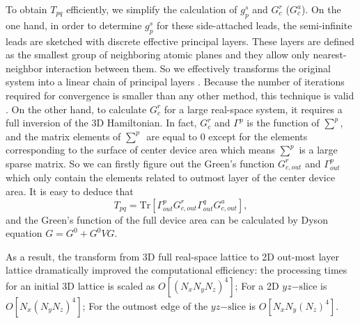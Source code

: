 \documentclass[twocolumn,superscriptaddress]{revtex4}%
\begin{document}
To obtain $T_{pq}$ efficiently, we simplify the calculation of $g_{p}^{s}$ and
$G_{c}^{r}$ ($G_{c}^{a}$). On the one hand, in order to determine $g_{p}^{s}$ for these
side-attached leads, the semi-infinite leads are sketched with discrete
effective principal layers. These layers are defined as the smallest group of
neighboring atomic planes and they allow only nearest-neighbor interaction
between them. So we effectively transforms the original system into a linear
chain of principal layers \cite{Sancho1984,TrM2013,Mtd2005,Mtd2006}. Because
the number of iterations required for convergence is smaller than any other
method, this technique is valid \cite{Iterations2008,Iterations2010}. On the
other hand, to calculate $G_{c}^{r}$ for a large real-space system, it
requires a full inversion of the 3D Hamiltonian. In fact, $G_{c}^{r}$ and
$\Gamma^{p}$ is the function of $\sum^{p}$, and the matrix elements of
$\sum^{p}$\ are equal to $0$ except for the elements corresponding to the
surface of center device area which means $\sum^{p}$ is a large sparse matrix.
So we can firstly figure out the Green's function $G_{c,out}^{r}$ and
$\Gamma_{out}^{p}$ which only contain the elements related to outmost layer of
the center device area. It is easy to deduce that%
\begin{equation}
T_{pq}=\mathrm{Tr}[\Gamma_{out}^{p}G_{c,out}^{r}\Gamma_{out}^{q}G_{c,out}%
^{a}],
\end{equation}
and the Green's function of the full device area can be calculated by Dyson
equation $G=G^{0}+G^{0}VG$.

As a result, the transform from 3D full real-space lattice to 2D out-most
layer lattice dramatically improved the  computational efficiency: the processing
times for an initial 3D lattice is scaled as $O[(N_{x}N_{y}N_{z})^{4}]$; For a
2D $yz\mathrm{-slice}$ is $O[N_{x}(N_{y}N_{z})^{4}]$; For the outmost edge of
the $yz\mathrm{-slice}$ is $O[N_{x}N_{y}(N_{z})^{4}]$.
\end{document}
